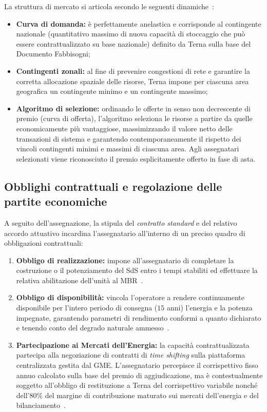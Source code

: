 La struttura di mercato si articola secondo le seguenti dinamiche~\cite{terna_disciplina}:
\begin{itemize}
    \item \textbf{Curva di domanda:} è perfettamente anelastica e corrisponde al contingente nazionale (quantitativo massimo di
    nuova capacità di stoccaggio che può essere contrattualizzato su base nazionale) definito da Terna sulla base del Documento Fabbisogni;
    \item \textbf{Contingenti zonali:} al fine di prevenire congestioni di rete e garantire la corretta allocazione spaziale delle risorse, Terna impone per ciascuna area geografica un contingente minimo e un contingente massimo;
    \item \textbf{Algoritmo di selezione:} ordinando le offerte in senso non decrescente di premio (curva di offerta), l'algoritmo seleziona le risorse a partire da quelle economicamente più vantaggiose, massimizzando il valore netto delle transazioni di sistema e garantendo contemporaneamente il rispetto dei vincoli contingenti minimi e massimi di ciascuna area. Agli assegnatari selezionati viene riconosciuto il premio esplicitamente offerto in fase di asta.
\end{itemize}

\subsection{Obblighi contrattuali e regolazione delle partite economiche}
A seguito dell'assegnazione, la stipula del \textit{contratto standard} e del relativo accordo attuativo incardina l'assegnatario all'interno di un preciso quadro di obbligazioni contrattuali:

\begin{enumerate}
    \item \textbf{Obbligo di realizzazione:} impone all'assegnatario di completare la costruzione o il potenziamento del SdS entro i tempi stabiliti ed effettuare la relativa abilitazione dell'unità al \ac{MBR}~\cite{terna_disciplina}.
    \item \textbf{Obbligo di disponibilità:} vincola l'operatore a rendere continuamente disponibile per l'intero periodo di consegna ($15$ anni) l'energia e la potenza impegnate, garantendo parametri di rendimento conformi a quanto dichiarato e tenendo conto del degrado naturale ammesso~\cite{dlgs210, terna_relazione, terna_disciplina}.
    \item \textbf{Partecipazione ai Mercati dell'Energia:} la capacità contrattualizzata partecipa alla negoziazione di contratti di \textit{time shifting} sulla piattaforma centralizzata gestita dal \ac{GME}. L'assegnatario percepisce il corrispettivo fisso annuo calcolato sulla base del premio di aggiudicazione, ma è contestualmente soggetto all'obbligo di restituzione a Terna del corrispettivo variabile nonché dell'$80\%$ del margine di contribuzione maturato sui mercati dell'energia e del bilanciamento~\cite{terna_disciplina}.
\end{enumerate}

